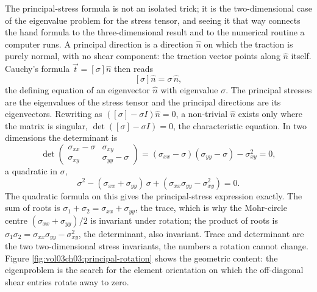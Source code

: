 The principal-stress formula is not an isolated trick; it is the
two-dimensional case of the eigenvalue problem for the stress tensor,
and seeing it that way connects the hand formula to the three-dimensional
result and to the numerical routine a computer runs. A principal
direction is a direction $\hat{n}$ on which the traction is purely
normal, with no shear component: the traction vector points along
$\hat{n}$ itself. Cauchy's formula $\vec{t} = [\sigma]\hat{n}$ then reads
\[
[\sigma]\hat{n} = \sigma\,\hat{n},
\]
the defining equation of an eigenvector $\hat{n}$ with eigenvalue
$\sigma$. The principal stresses are the eigenvalues of the stress
tensor and the principal directions are its eigenvectors. Rewriting as
$([\sigma] - \sigma I)\hat{n} = 0$, a non-trivial $\hat{n}$ exists only
where the matrix is singular, $\det([\sigma] - \sigma I) = 0$, the
characteristic equation. In two dimensions the determinant is
\[
\det\begin{pmatrix} \sigma_{xx} - \sigma & \sigma_{xy} \\ \sigma_{xy} &
\sigma_{yy} - \sigma \end{pmatrix} = (\sigma_{xx} - \sigma)(\sigma_{yy}
- \sigma) - \sigma_{xy}^2 = 0,
\]
a quadratic in $\sigma$,
\[
\sigma^2 - (\sigma_{xx} + \sigma_{yy})\,\sigma + (\sigma_{xx}\sigma_{yy}
- \sigma_{xy}^2) = 0.
\]
The quadratic formula on this gives the principal-stress expression
exactly. The sum of roots is $\sigma_1 + \sigma_2 = \sigma_{xx} +
\sigma_{yy}$, the trace, which is why the Mohr-circle centre $(\sigma_{xx}
+ \sigma_{yy})/2$ is invariant under rotation; the product of roots is
$\sigma_1\sigma_2 = \sigma_{xx}\sigma_{yy} - \sigma_{xy}^2$, the
determinant, also invariant. Trace and determinant are the two
two-dimensional stress invariants, the numbers a rotation cannot change.
Figure \ref{fig:vol03ch03:principal-rotation} shows the geometric
content: the eigenproblem is the search for the element orientation on
which the off-diagonal shear entries rotate away to zero.

